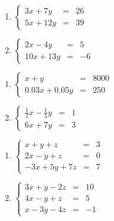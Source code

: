 \documentclass{ximera}
\begin{document}
\begin{multicols}{2}
\begin{enumerate}
\setcounter{enumi}{\value{HW}}

\item $\left\{ \begin{array}{rcr}   3x + 7y & = & 26 \\ 5x + 12y & = & 39  \end{array} \right.$ \label{solvecramerfirst}

\item $\left\{ \begin{array}{rcr}   2x-4y & = & 5 \\ 10x + 13y & = & -6  \end{array} \right.$

\setcounter{HW}{\value{enumi}}
\end{enumerate}
\end{multicols}

\begin{multicols}{2}
\begin{enumerate}
\setcounter{enumi}{\value{HW}}

\item $\left\{ \begin{array}{rcr}   x + y & = & 8000 \\ 0.03x + 0.05y & = & 250  \end{array} \right.$

\item $\left\{ \begin{array}{rcr}   \frac{1}{2}x  - \frac{1}{5}y & = & 1 \\ 6x +7y & = & 3  \end{array} \right.$



\setcounter{HW}{\value{enumi}}
\end{enumerate}
\end{multicols}

\begin{multicols}{2}
\begin{enumerate}
\setcounter{enumi}{\value{HW}}

\item $\left\{ \begin{array}{rcr} x + y + z & = & 3 \\ 2x - y + z & = & 0 \\ -3x + 5y + 7z & = & 7  \end{array} \right.$

\item $\left\{ \begin{array}{rcr} 3x + y - 2z & = & 10 \\ 4x - y + z & = & 5 \\ x -3y - 4z & = & -1  \end{array} \right.$ \label{solvecramerlast}

\setcounter{HW}{\value{enumi}}
\end{enumerate}
\end{multicols}
\end{document}
